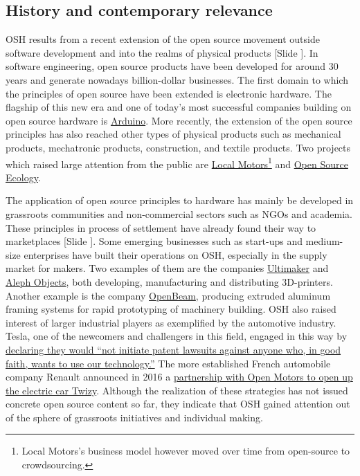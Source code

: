 \documentclass{article}
\newcounter{slide}
\begin{document}
\subsection{History and contemporary relevance}
\label{sec:OSHhistory}
OSH results from a recent extension of the open source movement outside software development and into the realms of physical products {\color{blue}[Slide ]}. In software engineering, open source products have been developed for around 30 years and generate nowadays billion-dollar businesses. The first domain to which the principles of open source have been extended is electronic hardware. The flagship of this new era and one of today's most successful companies building on open source hardware is \href{https://www.arduino.cc/}{Arduino}. More recently, the extension of the open source principles has also reached other types of physical products such as mechanical products, mechatronic products, construction, and textile products. Two projects which raised large attention from the public are \href{https://localmotors.com/}{Local Motors}\footnote{Local Motors's business model however moved over time from open-source to crowdsourcing.} and \href{https://www.opensourceecology.org/}{Open Source Ecology}. 

The application of open source principles to hardware has mainly be developed in grassroots communities and non-commercial sectors such as NGOs and academia. These principles in process of settlement have already found their way to marketplaces {\color{blue}[Slide ]}. Some emerging businesses such as start-ups and medium-size enterprises have built their operations on OSH, especially in the supply market for makers. Two examples of them are the companies \href{https://ultimaker.com/}{Ultimaker} and \href{https://www.alephobjects.com/}{Aleph Objects}, both developing, manufacturing and distributing 3D-printers. Another example is the company \href{https://ztautomations.com/openbeam/}{OpenBeam}, producing extruded aluminum framing systems for rapid prototyping of machinery building. OSH also raised interest of larger industrial players as exemplified by the automotive industry. Tesla, one of the newcomers and challengers in this field, engaged in this way by \href{https://www.tesla.com/blog/all-our-patent-are-belong-you}{declaring they would ``not initiate patent lawsuits against anyone who, in good faith, wants to use our technology.''} The more established French automobile company Renault announced in 2016 a \href{https://www.openmotors.co/renaultpomsignup/}{partnership with Open Motors to open up the electric car Twizy}. Although the realization of these strategies has not issued concrete open source content so far, they indicate that OSH gained attention out of the sphere of grassroots initiatives and individual making.
\end{document}

